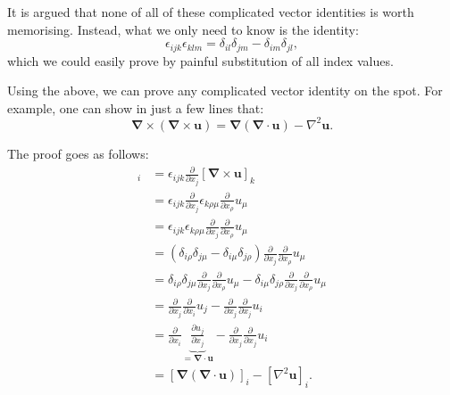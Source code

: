 It is argued that none of all of these complicated vector identities is worth memorising. Instead, what we only need to know is the identity:
    \begin{equation}
        \epsilon_{ijk}\epsilon_{klm} = \delta_{il}\delta_{jm} - \delta_{im}\delta_{jl},
    \end{equation}
which we could easily prove by painful substitution of all index values.

Using the above, we can prove any complicated vector identity on the spot. For example, one can show in just a few lines that:
\begin{equation}
    \boldsymbol{\nabla} \times (\boldsymbol{\nabla} \times \boldsymbol{u}) = \boldsymbol{\nabla}(\boldsymbol{\nabla}\cdot \boldsymbol{u}) - \nabla^2\boldsymbol{u}.
\end{equation}

The proof goes as follows:
\begin{align}
    [\boldsymbol{\nabla} \times (\boldsymbol{\nabla} \times \boldsymbol{u})]_i &= \epsilon_{ijk} \frac{\partial}{\partial x_j}[\boldsymbol{\nabla} \times \boldsymbol{u}]_k \nonumber\\
    &= \epsilon_{ijk} \frac{\partial}{\partial x_j}\epsilon_{k\rho\mu} \frac{\partial}{\partial x_\rho}u_\mu   \nonumber\\
    &=\epsilon_{ijk}\epsilon_{k\rho\mu} \frac{\partial}{\partial x_j}\frac{\partial}{\partial x_\rho} u_\mu  \nonumber\\
    &= (\delta_{i\rho}\delta_{j\mu} - \delta_{i\mu}\delta_{j\rho})\frac{\partial}{\partial x_j}\frac{\partial}{\partial x_\rho} u_\mu  \nonumber\\
    &=\delta_{i\rho}\delta_{j\mu}\frac{\partial}{\partial x_j}\frac{\partial}{\partial x_\rho} u_\mu - \delta_{i\mu}\delta_{j\rho}\frac{\partial}{\partial x_j}\frac{\partial}{\partial x_\rho} u_\mu  \nonumber\\
    &=\frac{\partial}{\partial x_j}\frac{\partial}{\partial x_i} u_j - \frac{\partial}{\partial x_j}\frac{\partial}{\partial x_j} u_i \nonumber\\
    &=\frac{\partial}{\partial x_i}\underbrace{\frac{\partial u_j}{\partial x_j}}_{=\boldsymbol{\nabla}\cdot\boldsymbol{u}} - \frac{\partial}{\partial x_j}\frac{\partial}{\partial x_j} u_i \nonumber\\
    &=[\boldsymbol{\nabla}(\boldsymbol{\nabla}\cdot\boldsymbol{u})]_i - [\nabla^2\boldsymbol{u}]_i.
\end{align}